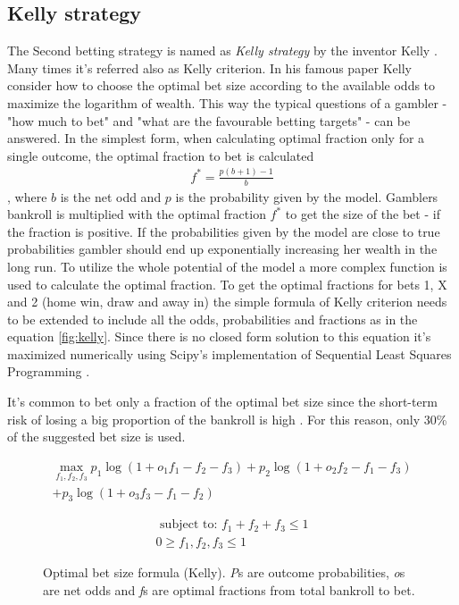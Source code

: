 \subsection{Kelly strategy}
The Second betting strategy is named as \textit{Kelly strategy} by the inventor Kelly \cite{kelly2011new}. Many times it's referred also as Kelly criterion. In his famous paper \cite{kelly2011new} Kelly consider how to choose the optimal bet size according to the available odds to maximize the logarithm of wealth. This way the typical questions of a gambler - "how much to bet" and "what are the favourable betting targets" -  can be answered. In the simplest form, when calculating optimal fraction only for a single outcome, the optimal fraction to bet is calculated
\begin{align*}
f ^ { * } =  \frac { p ( b + 1 ) - 1 } { b }
\end{align*}
, where $b$ is the net odd and $p$ is the probability given by the model. Gamblers bankroll is multiplied with the optimal fraction $f^{*}$ to get the size of the bet - if the fraction is positive. If the probabilities given by the model are close to true probabilities gambler should end up exponentially increasing her wealth in the long run. To utilize the whole potential of the model a more complex function is used to calculate the optimal fraction. To get the optimal fractions for bets 1, X and 2 (home win, draw and away in) the simple formula of Kelly criterion needs to be extended to include all the odds, probabilities and fractions as in the equation \ref{fig:kelly}. Since there is no closed form solution to this equation it's maximized numerically using Scipy's implementation of Sequential Least Squares Programming \cite{scipy}.

It's common to bet only a fraction of the optimal bet size since the short-term risk of losing a big proportion of the bankroll is high \cite{maclean2011medium}. For this reason, only 30\% of the suggested bet size is used.
\begin{figure}
    \caption{Optimal bet size formula (Kelly). \textit{P}s are outcome probabilities, \textit{o}s are net odds and \textit{f}s are optimal fractions from total bankroll to bet.}
     \begin{equation}
        \begin{split}
            \max_{f_1, f_2, f_3} p_1  \log(1 + o_1 f_1 - f_2 - f_3) + p_2 \log(1 + o_2 f_2 - f_1 - f_3)  \\
            + p_3 \log(1 + o_3 f_3 - f_1 - f_2)
        \end{split}
     \end{equation}

    \begin{align*}
        \text { subject to: }  f_1 + f_2 + f_3 \leq 1 \\
         0 \geq f_1, f_2, f_3 \leq 1
    \end{align*}
    \label{eq:kelly}
\end{figure}

